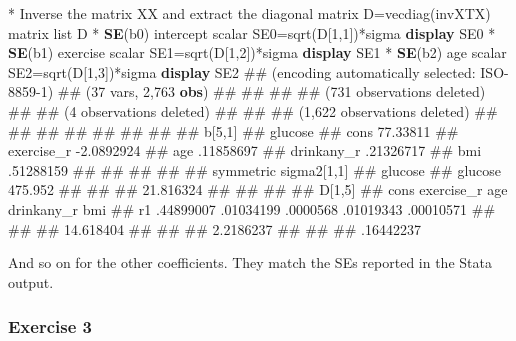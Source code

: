 \documentclass[
  letterpaper,
  DIV=11,
  numbers=noendperiod]{scrreprt}
\newenvironment{Shaded}{\begin{snugshade}}{\end{snugshade}}
\newcommand{\FunctionTok}[1]{\textcolor[rgb]{0.28,0.35,0.67}{#1}}
\newcommand{\KeywordTok}[1]{\textcolor[rgb]{0.00,0.23,0.31}{\textbf{#1}}}
\newcommand{\NormalTok}[1]{\textcolor[rgb]{0.00,0.23,0.31}{#1}}
\newcommand{\OtherTok}[1]{\textcolor[rgb]{0.00,0.23,0.31}{#1}}
\begin{document}
\begin{Shaded}
\begin{Highlighting}[]
\NormalTok{* Inverse the }\FunctionTok{matrix}\NormalTok{ X\textquotesingle{}X and extract the diagonal}
\FunctionTok{matrix}\NormalTok{ D=}\FunctionTok{vecdiag}\NormalTok{(invXTX)}
\FunctionTok{matrix} \OtherTok{list}\NormalTok{ D}
\NormalTok{* }\KeywordTok{SE}\NormalTok{(b0) intercept}
\FunctionTok{scalar}\NormalTok{ SE0=}\FunctionTok{sqrt}\NormalTok{(D[1,1])*sigma}
\KeywordTok{display}\NormalTok{ SE0}
\NormalTok{* }\KeywordTok{SE}\NormalTok{(b1) exercise}
\FunctionTok{scalar}\NormalTok{ SE1=}\FunctionTok{sqrt}\NormalTok{(D[1,2])*sigma}
\KeywordTok{display}\NormalTok{ SE1}
\NormalTok{* }\KeywordTok{SE}\NormalTok{(b2) age}
\FunctionTok{scalar}\NormalTok{ SE2=}\FunctionTok{sqrt}\NormalTok{(D[1,3])*sigma}
\KeywordTok{display}\NormalTok{ SE2}
\NormalTok{\#\# (encoding automatically selected: ISO{-}8859{-}1)}
\NormalTok{\#\# (37 vars, 2,763 }\KeywordTok{obs}\NormalTok{)}
\NormalTok{\#\# }
\NormalTok{\#\# }
\NormalTok{\#\# }
\NormalTok{\#\# (731 observations deleted)}
\NormalTok{\#\# }
\NormalTok{\#\# (4 observations deleted)}
\NormalTok{\#\# }
\NormalTok{\#\# }
\NormalTok{\#\# (1,622 observations deleted)}
\NormalTok{\#\# }
\NormalTok{\#\# }
\NormalTok{\#\# }
\NormalTok{\#\# }
\NormalTok{\#\# }
\NormalTok{\#\# }
\NormalTok{\#\# }
\NormalTok{\#\# b[5,1]}
\NormalTok{\#\#                glucose}
\NormalTok{\#\#       cons    77.33811}
\NormalTok{\#\# exercise\_r  {-}2.0892924}
\NormalTok{\#\#        age   .11858697}
\NormalTok{\#\# drinkany\_r   .21326717}
\NormalTok{\#\#        bmi   .51288159}
\NormalTok{\#\# }
\NormalTok{\#\# }
\NormalTok{\#\# }
\NormalTok{\#\# }
\NormalTok{\#\# symmetric sigma2[1,1]}
\NormalTok{\#\#          glucose}
\NormalTok{\#\# glucose  475.952}
\NormalTok{\#\# }
\NormalTok{\#\# }
\NormalTok{\#\# 21.816324}
\NormalTok{\#\# }
\NormalTok{\#\# }
\NormalTok{\#\# }
\NormalTok{\#\# D[1,5]}
\NormalTok{\#\#           cons  exercise\_r         age  drinkany\_r         bmi}
\NormalTok{\#\# r1   .44899007   .01034199    .0000568   .01019343   .00010571}
\NormalTok{\#\# }
\NormalTok{\#\# }
\NormalTok{\#\# 14.618404}
\NormalTok{\#\# }
\NormalTok{\#\# }
\NormalTok{\#\# 2.2186237}
\NormalTok{\#\# }
\NormalTok{\#\# }
\NormalTok{\#\# .16442237}
\end{Highlighting}
\end{Shaded}

And so on for the other coefficients. They match the SEs reported in the
Stata output.

\subsubsection*{Exercise 3}\label{exercise-3}
\end{document}
